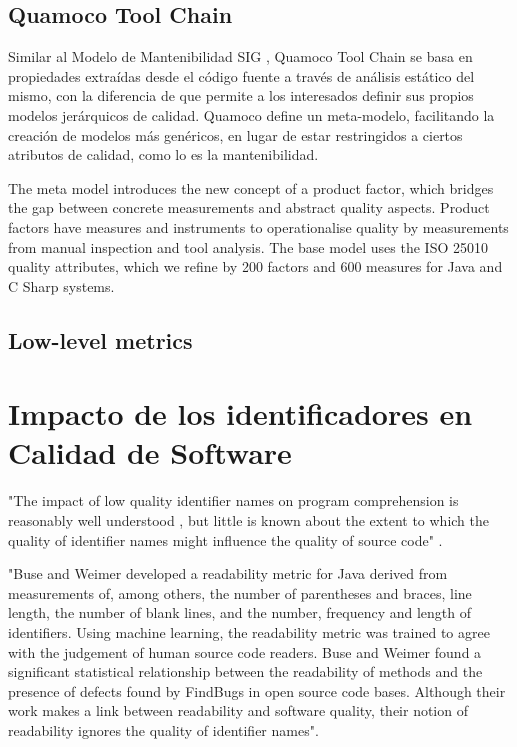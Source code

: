 \subsection{Quamoco Tool Chain}

Similar al Modelo de Mantenibilidad SIG \cite{Heitlager2007}, Quamoco Tool Chain \cite{Wagner2012}
se basa en propiedades extraídas desde el código fuente a través de análisis estático del mismo,
con la diferencia de que permite a los interesados definir sus propios modelos jerárquicos
de calidad.
Quamoco define un meta-modelo, facilitando la creación de modelos más genéricos, en lugar de
estar restringidos a ciertos atributos de calidad, como lo es la mantenibilidad.

The meta model introduces the new concept of a product factor, which bridges the gap between
concrete measurements and abstract quality aspects.
Product factors have measures and instruments to operationalise quality by measurements from
manual inspection and tool analysis.
The base model uses the ISO 25010 quality attributes, which we refine by 200 factors and 600
measures for Java and C Sharp systems.

\subsection{Low-level metrics}

\section{Impacto de los identificadores en Calidad de Software}

"The impact of low quality identifier names on program comprehension is reasonably
well understood \cite{DeiBenbockPizka05,Lawrie2007,Lawrie2006}, but little is known
about the extent to which the quality of identifier names might influence the quality
of source code" \cite{ButlerWemelingerYu10}.

"Buse and Weimer \cite{Buse2008} developed a readability metric for Java derived from measurements 
of, among others, the number of parentheses and braces, line length, the number
of blank lines, and the number, frequency and length of identifiers.
Using machine learning, the readability metric was trained to agree with the judgement 
of human source code readers.
Buse and Weimer found a significant statistical relationship between the readability of 
methods and the presence of defects found by FindBugs in open source code bases. 
Although their work makes a link between readability and software quality, their notion
of readability ignores the quality of identifier names".

